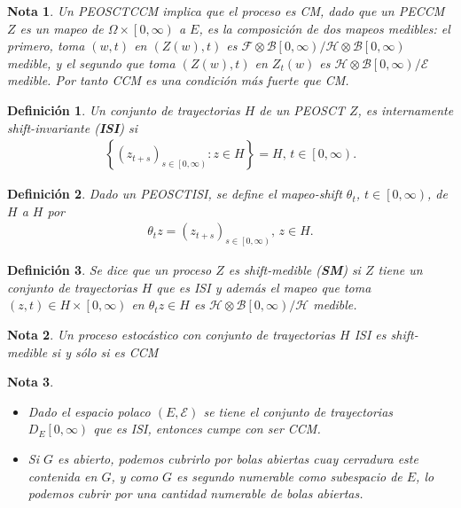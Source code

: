 \documentclass{article}
\newtheorem{Def}{Definición}
\newtheorem{Note}{Nota}
\begin{document}
\begin{Note}
Un PEOSCTCCM implica que el proceso es CM, dado que un PECCM $Z$ es un mapeo de $\Omega\times\left[0,\infty\right)$ a $E$, es la composici\'on de dos mapeos medibles: el primero, toma $\left(w,t\right)$ en $\left(Z\left(w\right),t\right)$ es $\mathcal{F}\otimes\mathcal{B}\left[0,\infty\right)/\mathcal{H}\otimes\mathcal{B}\left[0,\infty\right)$ medible, y el segundo que toma $\left(Z\left(w\right),t\right)$  en $Z_{t}\left(w\right)$ es $\mathcal{H}\otimes\mathcal{B}\left[0,\infty\right)/\mathcal{E}$ medible. Por tanto CCM es una condici\'on m\'as fuerte que CM.
\end{Note}

\begin{Def}
Un conjunto de trayectorias $H$ de un PEOSCT $Z$, es internamente shift-invariante (\textbf{ISI}) si 
\begin{eqnarray*}
\left\{\left(z_{t+s}\right)_{s\in\left[0,\infty\right)}:z\in H\right\}=H\textrm{, }t\in\left[0,\infty\right).
\end{eqnarray*}
\end{Def}


\begin{Def}
Dado un PEOSCTISI, se define el mapeo-shift $\theta_{t}$, $t\in\left[0,\infty\right)$, de $H$ a $H$ por 
\begin{eqnarray*}
\theta_{t}z=\left(z_{t+s}\right)_{s\in\left[0,\infty\right)}\textrm{, }z\in H.
\end{eqnarray*}
\end{Def}

\begin{Def}
Se dice que un proceso $Z$ es shift-medible (\textbf{SM}) si $Z$ tiene un conjunto de trayectorias $H$ que es ISI y adem\'as el mapeo que toma $\left(z,t\right)\in H\times\left[0,\infty\right)$ en $\theta_{t}z\in H$ es $\mathcal{H}\otimes\mathcal{B}\left[0,\infty\right)/\mathcal{H}$ medible.
\end{Def}

\begin{Note}
Un proceso estoc\'astico con conjunto de trayectorias $H$ ISI es shift-medible si y s\'olo si es CCM
\end{Note}

\begin{Note}
\begin{itemize}
\item Dado el espacio polaco $\left(E,\mathcal{E}\right)$ se tiene el  conjunto de trayectorias $D_{E}\left[0,\infty\right)$ que es ISI, entonces cumpe con ser CCM.

\item Si $G$ es abierto, podemos cubrirlo por bolas abiertas cuay cerradura este contenida en $G$, y como $G$ es segundo numerable como subespacio de $E$, lo podemos cubrir por una cantidad numerable de bolas abiertas.

\end{itemize}
\end{Note}
\end{document}

